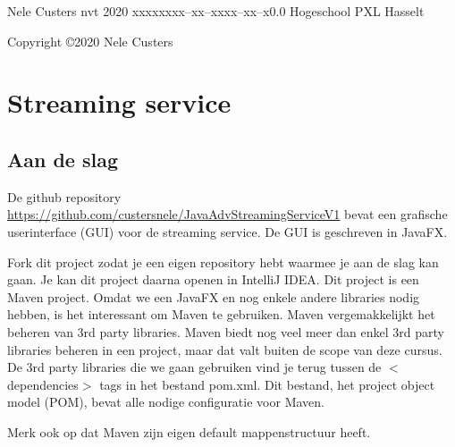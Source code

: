\documentclass{tstextbook}
\begin{document}
       {Nele Custers}
       {nvt}
       {2020}
       {xxxxx}{xxx--xx--xxxx--xx--x}{0.0}
       {Hogeschool PXL}
       {Hasselt}
       
\pagebreak

\null
\vfill
\begin{flushleft}
  Copyright \copyright 2020 Nele Custers
  \vspace{5mm}
\end{flushleft}




\renewcommand{\thesection}{\arabic{section}}

\chapter*{Streaming service}

\section{Aan de slag}

De github repository \url{https://github.com/custersnele/JavaAdvStreamingServiceV1} bevat een grafische userinterface (GUI) voor de streaming service.  De GUI is geschreven in JavaFX.

Fork dit project zodat je een eigen repository hebt waarmee je aan de slag kan gaan.
Je kan dit project daarna openen in IntelliJ IDEA. Dit project is een Maven project. 
Omdat we een JavaFX en nog enkele andere libraries nodig hebben,  is het interessant om Maven te gebruiken. Maven vergemakkelijkt het beheren van 3rd party libraries. Maven biedt nog veel meer dan enkel 3rd party libraries beheren in een project, maar dat valt buiten de scope van deze cursus. De 3rd party libraries die we gaan gebruiken vind je terug tussen de $<$dependencies$>$ tags in het bestand pom.xml. Dit bestand, het project object model (POM), bevat alle nodige configuratie voor Maven. 

Merk ook op dat Maven zijn eigen default mappenstructuur heeft.
\end{document}
